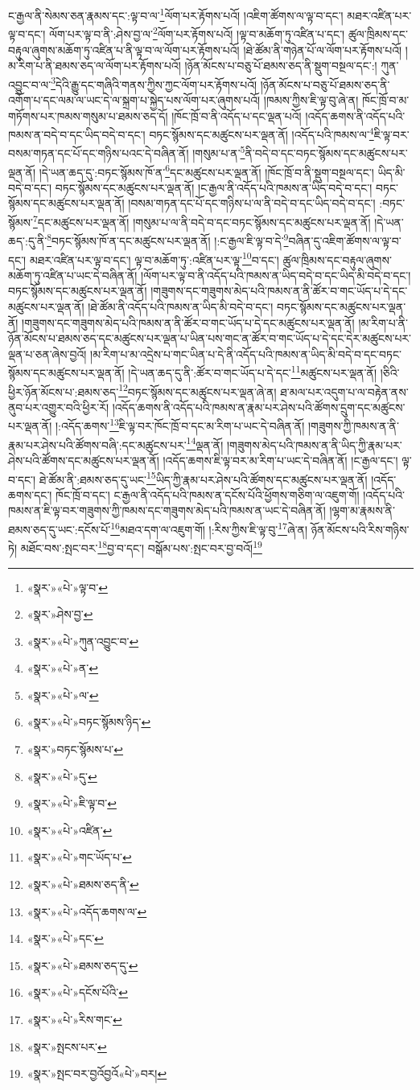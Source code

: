 ང་རྒྱལ་ནི་སེམས་ཅན་རྣམས་དང་:ལྟ་བ་ལ་\footnote{«སྣར་»«པེ་»ལྟ་བ་}ལོག་པར་རྟོགས་པའོ། །འཇིག་ཚོགས་ལ་ལྟ་བ་དང་། མཐར་འཛིན་པར་ལྟ་བ་དང་། ལོག་པར་ལྟ་བ་ནི་:ཤེས་བྱ་ལ་\footnote{«སྣར་»ཤེས་བྱ་}ལོག་པར་རྟོགས་པའོ། །ལྟ་བ་མཆོག་ཏུ་འཛིན་པ་དང་། ཚུལ་ཁྲིམས་དང་བརྟུལ་ཞུགས་མཆོག་ཏུ་འཛིན་པ་ནི་ལྟ་བ་ལ་ལོག་པར་རྟོགས་པའོ། །ཐེ་ཚོམ་ནི་གཉེན་པོ་ལ་ལོག་པར་རྟོགས་པའོ། །མ་རིག་པ་ནི་ཐམས་ཅད་ལ་ལོག་པར་རྟོགས་པའོ། །ཉོན་མོངས་པ་བཅུ་པོ་ཐམས་ཅད་ནི་སྡུག་བསྔལ་དང་:། ཀུན་འབྱུང་བ་ལ་\footnote{«སྣར་»«པེ་»ཀུན་འབྱུང་བ་}དེའི་རྒྱུ་དང་གཞིའི་གནས་ཀྱིས་ཀྱང་ལོག་པར་རྟོགས་པའོ། །ཉོན་མོངས་པ་བཅུ་པོ་ཐམས་ཅད་ནི་འགོག་པ་དང་ལམ་ལ་ཡང་དེ་ལ་སྐྲག་པ་སྐྱེད་པས་ལོག་པར་ཞུགས་པའོ། །ཁམས་ཀྱིས་ཇི་ལྟ་བུ་ཞེ་ན། ཁོང་ཁྲོ་བ་མ་གཏོགས་པར་ཁམས་གསུམ་པ་ཐམས་ཅད་དོ། །ཁོང་ཁྲོ་བ་ནི་འདོད་པ་དང་ལྡན་པའོ། །འདོད་ཆགས་ནི་འདོད་པའི་ཁམས་ན་བདེ་བ་དང་ཡིད་བདེ་བ་དང་། བཏང་སྙོམས་དང་མཚུངས་པར་ལྡན་ནོ། །འདོད་པའི་ཁམས་ལ་\footnote{«སྣར་»«པེ་»ན་}ཇི་ལྟ་བར་བསམ་གཏན་དང་པོ་དང་གཉིས་པའང་དེ་བཞིན་ནོ། །གསུམ་པ་ན་\footnote{«སྣར་»«པེ་»ལ་}ནི་བདེ་བ་དང་བཏང་སྙོམས་དང་མཚུངས་པར་ལྡན་ནོ། །དེ་ཡན་ཆད་དུ་:བཏང་སྙོམས་ཁོ་ན་\footnote{«སྣར་»«པེ་»བཏང་སྙོམས་ཉིད་}དང་མཚུངས་པར་ལྡན་ནོ། །ཁོང་ཁྲོ་བ་ནི་སྡུག་བསྔལ་དང་། ཡིད་མི་བདེ་བ་དང་། བཏང་སྙོམས་དང་མཚུངས་པར་ལྡན་ནོ། །ང་རྒྱལ་ནི་འདོད་པའི་ཁམས་ན་ཡིད་བདེ་བ་དང་། བཏང་སྙོམས་དང་མཚུངས་པར་ལྡན་ནོ། །བསམ་གཏན་དང་པོ་དང་གཉིས་པ་ལ་ནི་བདེ་བ་དང་ཡིད་བདེ་བ་དང་། :བཏང་སྙོམས་\footnote{«སྣར་»བཏང་སྙོམས་པ་}དང་མཚུངས་པར་ལྡན་ནོ། །གསུམ་པ་ལ་ནི་བདེ་བ་དང་བཏང་སྙོམས་དང་མཚུངས་པར་ལྡན་ནོ། །དེ་ཡན་ཆད་:དུ་ནི་\footnote{«སྣར་»«པེ་»དུ་}བཏང་སྙོམས་ཁོ་ན་དང་མཚུངས་པར་ལྡན་ནོ། །:ང་རྒྱལ་ཇི་ལྟ་བ་དེ་\footnote{«སྣར་»«པེ་»ཇི་ལྟ་བ་}བཞིན་དུ་འཇིག་ཚོགས་ལ་ལྟ་བ་དང་། མཐར་འཛིན་པར་ལྟ་བ་དང་། ལྟ་བ་མཆོག་ཏུ་:འཛིན་པར་ལྟ་\footnote{«སྣར་»«པེ་»འཛིན་}བ་དང་། ཚུལ་ཁྲིམས་དང་བརྟུལ་ཞུགས་མཆོག་ཏུ་འཛིན་པ་ཡང་དེ་བཞིན་ནོ། །ལོག་པར་ལྟ་བ་ནི་འདོད་པའི་ཁམས་ན་ཡིད་བདེ་བ་དང་ཡིད་མི་བདེ་བ་དང་། བཏང་སྙོམས་དང་མཚུངས་པར་ལྡན་ནོ། །གཟུགས་དང་གཟུགས་མེད་པའི་ཁམས་ན་ནི་ཚོར་བ་གང་ཡོད་པ་དེ་དང་མཚུངས་པར་ལྡན་ནོ། །ཐེ་ཚོམ་ནི་འདོད་པའི་ཁམས་ན་ཡིད་མི་བདེ་བ་དང་། བཏང་སྙོམས་དང་མཚུངས་པར་ལྡན་ནོ། །གཟུགས་དང་གཟུགས་མེད་པའི་ཁམས་ན་ནི་ཚོར་བ་གང་ཡོད་པ་དེ་དང་མཚུངས་པར་ལྡན་ནོ། །མ་རིག་པ་ནི་ཉོན་མོངས་པ་ཐམས་ཅད་དང་མཚུངས་པར་ལྡན་པ་ཡིན་པས་གང་ན་ཚོར་བ་གང་ཡོད་པ་དེ་དང་དེར་མཚུངས་པར་ལྡན་པ་ཅན་ཞེས་བྱའོ། །མ་རིག་པ་མ་འདྲེས་པ་གང་ཡིན་པ་དེ་ནི་འདོད་པའི་ཁམས་ན་ཡིད་མི་བདེ་བ་དང་བཏང་སྙོམས་དང་མཚུངས་པར་ལྡན་ནོ། །དེ་ཡན་ཆད་དུ་ནི་:ཚོར་བ་གང་ཡོད་པ་དེ་དང་\footnote{«སྣར་»«པེ་»གང་ཡོད་པ་}མཚུངས་པར་ལྡན་ནོ། །ཅིའི་ཕྱིར་ཉོན་མོངས་པ་:ཐམས་ཅད་\footnote{«སྣར་»«པེ་»ཐམས་ཅད་ནི་}བཏང་སྙོམས་དང་མཚུངས་པར་ལྡན་ཞེ་ན། ཐ་མལ་པར་འདུག་པ་ལ་བརྟེན་ནས་ནུབ་པར་འགྱུར་བའི་ཕྱིར་རོ། །འདོད་ཆགས་ནི་འདོད་པའི་ཁམས་ན་རྣམ་པར་ཤེས་པའི་ཚོགས་དྲུག་དང་མཚུངས་པར་ལྡན་ནོ། །:འདོད་ཆགས་\footnote{«སྣར་»«པེ་»འདོད་ཆགས་ལ་}ཇི་ལྟ་བར་ཁོང་ཁྲོ་བ་དང་མ་རིག་པ་ཡང་དེ་བཞིན་ནོ། །གཟུགས་ཀྱི་ཁམས་ན་ནི་རྣམ་པར་ཤེས་པའི་ཚོགས་བཞི་:དང་མཚུངས་པར་\footnote{«སྣར་»«པེ་»དང་}ལྡན་ནོ། །གཟུགས་མེད་པའི་ཁམས་ན་ནི་ཡིད་ཀྱི་རྣམ་པར་ཤེས་པའི་ཚོགས་དང་མཚུངས་པར་ལྡན་ནོ། །འདོད་ཆགས་ཇི་ལྟ་བར་མ་རིག་པ་ཡང་དེ་བཞིན་ནོ། །ང་རྒྱལ་དང་། ལྟ་བ་དང་། ཐེ་ཚོམ་ནི་:ཐམས་ཅད་དུ་ཡང་\footnote{«སྣར་»«པེ་»ཐམས་ཅད་དུ་}ཡིད་ཀྱི་རྣམ་པར་ཤེས་པའི་ཚོགས་དང་མཚུངས་པར་ལྡན་ནོ། །འདོད་ཆགས་དང་། ཁོང་ཁྲོ་བ་དང་། ང་རྒྱལ་ནི་འདོད་པའི་ཁམས་ན་དངོས་པོའི་ཕྱོགས་གཅིག་ལ་འཇུག་གོ། །འདོད་པའི་ཁམས་ན་ཇི་ལྟ་བར་གཟུགས་ཀྱི་ཁམས་དང་གཟུགས་མེད་པའི་ཁམས་ན་ཡང་དེ་བཞིན་ནོ། །ལྷག་མ་རྣམས་ནི་ཐམས་ཅད་དུ་ཡང་:དངོས་པོ་\footnote{«སྣར་»«པེ་»དངོས་པོའི་}མཐའ་དག་ལ་འཇུག་གོ། །:རིས་ཀྱིས་ཇི་ལྟ་བུ་\footnote{«སྣར་»«པེ་»རིས་གང་}ཞེ་ན། ཉོན་མོངས་པའི་རིས་གཉིས་ཏེ། མཐོང་བས་:སྤང་བར་\footnote{«སྣར་»སྤངས་པར་}བྱ་བ་དང་། བསྒོམ་པས་:སྤང་བར་བྱ་བའོ།\footnote{«སྣར་»སྤང་བར་བྱའོབྱའོ«པེ་»བར།} 